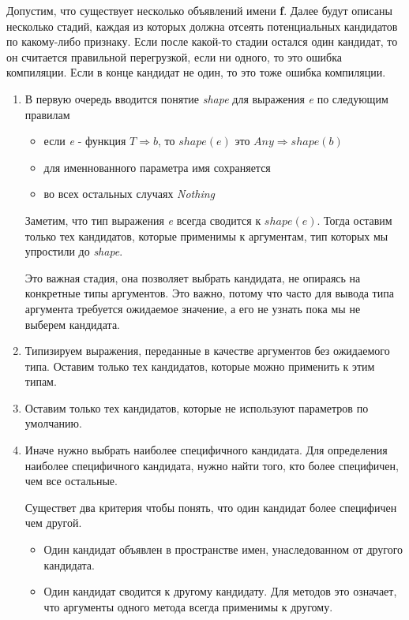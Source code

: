 Допустим, что существует несколько объявлений имени \textbf{f}.
Далее будут описаны несколько стадий, каждая из которых должна отсеять
потенциальных кандидатов по какому-либо признаку.
Если после какой-то стадии остался один кандидат, то он считается правильной
перегрузкой, если ни одного, то это ошибка компиляции.
Если в конце кандидат не один, то это тоже ошибка компиляции.

\begin{enumerate}
  \item В первую очередь вводится понятие \textit{shape} для выражения
  \textit{e} по следующим правилам
  \begin{itemize}
    \item если \textit{e} - функция $\mathit{T \Rightarrow b}$,
    то $\mathit{shape}(\mathit{e})$ это $\mathit{Any \Rightarrow shape}(\mathit{b})$
    \item для именнованного параметра имя сохраняется
    \item во всех остальных случаях \textit{Nothing}
  \end{itemize}

  Заметим, что тип выражения \textit{e} всегда сводится к $\mathit{shape}(\mathit{e})$.
  Тогда оставим только тех кандидатов, которые применимы к аргументам, тип которых
  мы упростили до \textit{shape}.

  Это важная стадия, она позволяет выбрать кандидата, не опираясь на конкретные
  типы аргументов.
  Это важно, потому что часто для вывода типа аргумента требуется ожидаемое
  значение, а его не узнать пока мы не выберем кандидата.

  \item Типизируем выражения, переданные в качестве аргументов без ожидаемого типа.
  Оставим только тех кандидатов, которые можно применить к этим типам.

  \item Оставим только тех кандидатов, которые не используют параметров по умолчанию.

  \item Иначе нужно выбрать наиболее специфичного кандидата.
  Для определения наиболее специфичного кандидата, нужно найти того, кто более
  специфичен, чем все остальные.

  Существет два критерия чтобы понять, что один кандидат более специфичен чем
  другой.
  \begin{itemize}
    \item Один кандидат объявлен в пространстве имен, унаследованном от другого
    кандидата.
    \item Один кандидат сводится к другому кандидату. Для методов это означает,
    что аргументы одного метода всегда применимы к другому.
  \end{itemize}
\end{enumerate}

